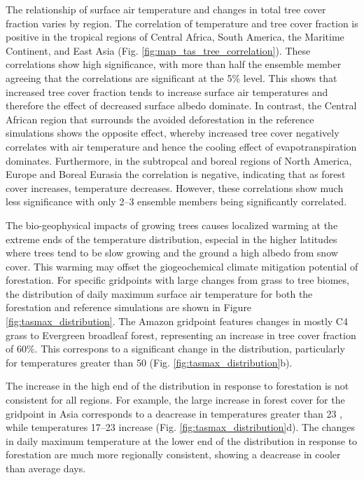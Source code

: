 \documentclass[]{article}
\begin{document}
The relationship of surface air temperature and changes in total tree cover fraction varies by region.
The correlation of temperature and tree cover fraction is positive in the tropical regions of Central Africa, South America, the Maritime Continent, and East Asia (Fig. \ref{fig:map_tas_tree_correlation}).
These correlations show high significance, with more than half the ensemble member agreeing that the correlations are significant at the 5\% level.
This shows that increased tree cover fraction tends to increase surface air temperatures and therefore the effect of decreased surface albedo dominate.
In contrast, the Central African region that surrounds the avoided deforestation in the reference simulations shows the opposite effect, whereby increased tree cover negatively correlates with air temperature and hence the cooling effect of evapotranspiration dominates.
Furthermore, in the subtropcal and boreal regions of North America, Europe and Boreal Eurasia the correlation is negative, indicating that as forest cover increases, temperature decreases.
However, these correlations show much less significance with only 2–3 ensemble members being significantly correlated.

The bio-geophysical impacts of growing trees causes localized warming at the extreme ends of the temperature distribution, especial in the higher latitudes where trees tend to be slow growing and the ground a high albedo from snow cover.
This warming may offset the giogeochemical climate mitigation potential of forestation.
For specific gridpoints with large changes from grass to tree biomes, the distribution of daily maximum surface air temperature for both the forestation and reference simulations are shown in Figure \ref{fig:tasmax_distribution}.
The Amazon gridpoint features changes in mostly C4 grass to Evergreen broadleaf forest, representing an increase in tree cover fraction of 60\%.
This correspons to a significant change in the distribution, particularly for temperatures greater than 50 \textcelsius{} (Fig. \ref{fig:tasmax_distribution}b).

The increase in the high end of the distribution in response to forestation is not consistent for all regions.
For example, the large increase in forest cover for the gridpoint in Asia corresponds to a deacrease in temperatures greater than 23 \textcelsius{}, while temperatures 17–23 \textcelsius{} increase (Fig. \ref{fig:tasmax_distribution}d).
The changes in daily maximum temperature at the lower end of the distribution in response to forestation are much more regionally consistent, showing a deacrease in cooler than average days.
\end{document}
